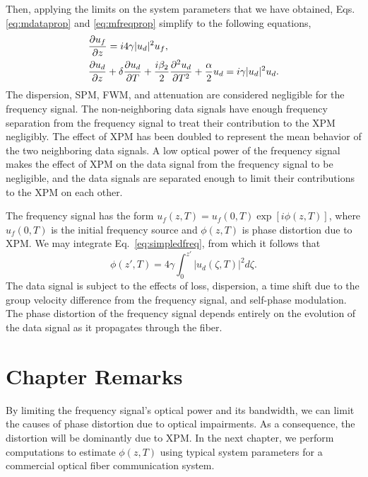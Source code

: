 Then, applying the limits on the system parameters that we have obtained, Eqs. \ref{eq:mdataprop} and \ref{eq:mfreqprop} simplify to the following equations,
%
\begin{subequations}
\begin{align}
\label{eq:simpledfreq}
&\frac{\partial u_f}{\partial z} = i4\gamma|u_d|^2u_f, \\
\label{eq:simpleddata}
&\frac{\partial u_d}{\partial z} + \delta\frac{\partial u_d}{\partial T} + \frac{i\beta_{2}}{2}\frac{\partial ^2u_d}{\partial T^2} + \frac{\alpha}{2}u_d = i\gamma|u_d|^2u_d.
\end{align}
\end{subequations}
%
The dispersion, SPM, FWM, and attenuation are considered negligible for the frequency signal. The non-neighboring data signals have enough frequency separation from the frequency signal to treat their contribution to the XPM negligibly. The effect of XPM has been doubled to represent the mean behavior of the two neighboring data signals. A low optical power of the frequency signal makes the effect of XPM on the data signal from the frequency signal to be negligible, and the data signals are separated enough to limit their contributions to the XPM on each other. 

The frequency signal has the form $u_f(z,T) = u_f(0,T)\exp[i\phi(z,T)]$, where $u_f(0,T)$ is the initial frequency source and $\phi(z,T)$ is phase distortion due to XPM. We may integrate Eq.~\ref{eq:simpledfreq}, from which it follows that
%
\begin{equation} \label{eq:phasedistort}
	\phi(z',T) = 4\gamma\int_0^{z'} |u_d(\zeta, T)|^2 d\zeta.
\end{equation}
%
The data signal is subject to the effects of loss, dispersion, a time shift due to the group velocity difference from the frequency signal, and self-phase modulation. The phase distortion of the frequency signal depends entirely on the evolution of the data signal as it propagates through the fiber.

\section{Chapter Remarks} \label{sec:3conc}

By limiting the frequency signal's optical power and its bandwidth, we can limit the causes of phase distortion due to optical impairments. As a consequence, the distortion will be dominantly due to XPM. In the next chapter, we perform computations to estimate $\phi(z,T)$ using typical system parameters for a commercial optical fiber communication system.